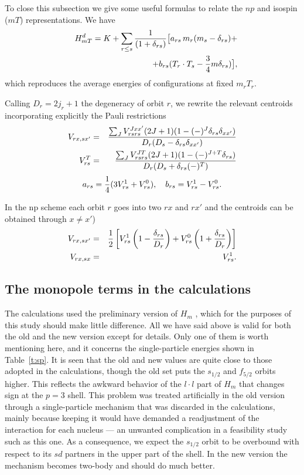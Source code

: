\begin{multicols}{2}
To close this subsection we give some useful formulas to relate the
$np$ and isospin ($mT$) representations. We have
\begin{eqnarray}
&&{H}_{mT}^d =K+\sum_{r\leq s}{1 \over (1+\delta_{rs})}
\bigl[a_{rs}\,m_r(m_s-\delta_{rs})+\nonumber\\
&&             +b_{rs}(T_r\cdot  T_s-{3\over 4}m\delta_{rs})\bigr],
\label{hmt}
\end{eqnarray}
which reproduces the average energies of configurations at fixed $m_rT_r$.

Calling $D_r=2j_r+1$ the degeneracy of orbit $r$, we rewrite the
relevant centroids incorporating explicitly the Pauli restrictions
\begin{eqnarray}
V_{rx,sx'}&=&{\sum_J V_{rsrs}^{Jxx'}(2J+1)
  ( 1-(-)^J\delta_{rs}\delta_{xx'})\over
  D_r(D_s-\delta_{rs}\delta_{xx'})}\nonumber\\
V_{rs}^T&=&{\sum_J V_{rsrs}^{JT}(2J+1)
( 1-(-)^{J+T}\delta_{rs})\over D_r(D_s+\delta_{rs}(-)^T)}
\label{vnp}
\end{eqnarray}
\begin{equation}
a_{rs}={1\over 4}(3V^1_{rs}+V^0_{rs}), \quad
b_{rs}=V^1_{rs}-V^0_{rs}.
\label{ab}
\end{equation}

In the np scheme each orbit $r$ goes into two $rx$ and $rx'$
and the centroids can be obtained through
 $x\ne x'$)
\begin{eqnarray}
V_{rx,sx'}&=&{1\over 2}\left\lbrack V_{rs}^1\left(1-{\delta_{rs}\over D_r}
\right)+ V_{rs}^0\left(1+{\delta_{rs}\over D_r}
\right)\right\rbrack\nonumber\\
V_{rx,sx}&=&V_{rs}^1.
\label{npmt}
\end{eqnarray}

\subsection{The monopole terms in the calculations}

The calculations used the preliminary version of $H_m$ \cite{dz98},
which for the purposes of this study should make little difference.
All we have said above is valid for both the old and the new version
except for details. Only one of them is worth mentioning here, and it
concerns the single-particle energies shown in Table~\ref{t:sp}. It
is seen that the old and new values are quite close to those adopted
in the calculations, though the old set puts the $s_{1/2}$ and
$f_{5/2}$ orbits higher. This reflects the awkward behavior of the
$l\cdot l$ part of $H_m$ that changes sign at the $p=3$ shell. This
problem was treated artificially in the old version through a
single-particle mechanism that was discarded in the calculations,
mainly because keeping it would have demanded a readjustment of the
interaction for each nucleus --- an unwanted complication in a
feasibility study such as this one. As a consequence, we expect the
$s_{1/2}$ orbit to be overbound with respect to its $sd$ partners in
the upper part of the shell. In the new version the mechanism becomes
two-body and should do much better.


\end{multicols}
